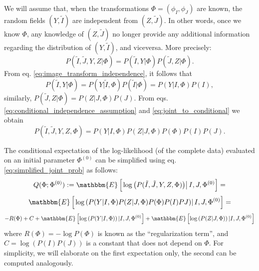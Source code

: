 We will assume that, when the transformations $\Phi=(\phi_{I}, \phi_{J})$ are known, the random fields $(Y, \tilde{I})$ are independent from $(Z, \tilde{J})$. In other words, once we know $\Phi$, any knowledge of $(Z, \tilde{J})$ no longer provide any additional information regarding the distribution of $(Y, \tilde{I})$, and viceversa. More precisely:
\begin{equation}\label{eq:conditional_independence_assumption}
    P(\tilde{I}, \tilde{J}, Y, Z | \Phi) = P(\tilde{I}, Y | \Phi)P(\tilde{J}, Z| \Phi).
\end{equation}
From eq. \eqref{eq:image_transform_independence}, it follows that
\begin{equation}\label{eq:joint_to_conditional}
    P(\tilde{I}, Y | \Phi) = P(Y | \tilde{I}, \Phi)P(\tilde{I} | \Phi) = P(Y | I, \Phi)P(I),
\end{equation}
similarly, $P(\tilde{J}, Z| \Phi) = P(Z| J, \Phi)P(J)$. From eqs. \eqref{eq:conditional_independence_assumption} and \eqref{eq:joint_to_conditional} we obtain
\begin{equation}\label{eq:simplified_joint_prob}
    P(\tilde{I}, \tilde{J}, Y, Z, \Phi) = P(Y | I, \Phi)P(Z| J, \Phi)P(\Phi)P(I)P(J).
\end{equation}

The conditional expectation of the log-likelihood (of the complete data) evaluated on an initial parameter $\Phi^{(0)}$ can be simplified using eq. \eqref{eq:simplified_joint_prob} as follows:
\begin{displaymath}
    Q(\Phi; \Phi^{(0)}) := \mathbbm{E}\left[\left. \log \left(P(\tilde{I}, \tilde{J}, Y, Z, \Phi)\right) \right | I, J, \Phi^{(0)}\right] =
\end{displaymath}
\begin{displaymath}
    \mathbbm{E}\left[\left. \log \left(P(Y |I, \Phi)P(Z|J, \Phi)P(\Phi)P(I)P{J}\right) \right | I, J, \Phi^{(0)}\right] =
\end{displaymath}
\begin{equation}\label{eq:separated_expectations}
    -R(\Phi) + C + \mathbbm{E}\left[ \log \left(P(Y|I, \Phi)\right) | I, J, \Phi^{(0)}\right] + \mathbbm{E}\left[ \log \left(P(Z|J, \Phi)\right) | I, J, \Phi^{(0)}\right]
\end{equation}
where $R(\Phi) = -\log P(\Phi)$ is known as the ``regularization term'', and \hbox{$C=\log \left(P(I)P(J)\right)$} is a constant that does not depend on $\Phi$. For simplicity, we will elaborate on the first expectation only, the second can be computed analogously.\\

